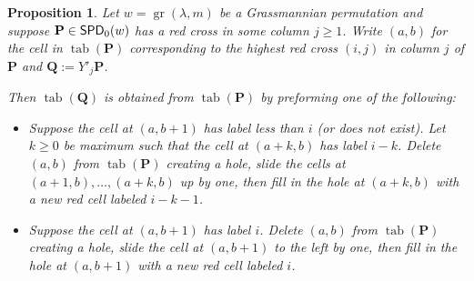 \documentclass[11pt,reqno]{amsart} %
\newcommand{\bfP}{\mathbf{P}}
\newcommand{\bfQ}{\mathbf{Q}}
\DeclareMathOperator{\Grass}{gr}
\DeclareMathOperator{\SPD}{\sf{SPD}}
\DeclareMathOperator{\tab}{tab}
\newtheorem{proposition}[theorem]{Proposition}
\theoremstyle{definition}
\begin{document}
\begin{proposition}
\label{prop:grass pipe dream jdt}
Let $w = \Grass(\lambda,m)$ be a Grassmannian permutation and suppose $\bfP\in \SPD_0(w)$ has a red cross in some column $j\geq 1$.
Write $(a,b)$ for the cell in $\tab(\bfP)$ corresponding to the highest red cross $(i,j)$ in column $j$ of $\bfP$ and $\bfQ := Y'_j\bfP$.

Then $\tab(\bfQ)$ is obtained from $\tab(\bfP)$ by preforming one of the following:

\begin{itemize}
\item[$\lozenge$]
Suppose the cell at $(a,b+1)$ has label less than $i$ (or does not exist).
Let $k\geq 0$ be maximum such that the cell at $(a+k,b)$ has label $i-k$.
Delete $(a,b)$ from $\tab(\bfP)$ creating a hole, slide the cells at $(a+1,b),\dots,(a+k,b)$ up by one, then fill in the hole at $(a+k,b)$ with a new red cell labeled $i-k-1$.

\item[$\blacklozenge$]
Suppose the cell at $(a,b+1)$ has label $i$.
Delete $(a,b)$ from $\tab(\bfP)$ creating a hole, slide the cell at $(a,b+1)$ to the left by one, then fill in the hole at $(a,b+1)$ with a new red cell labeled $i$.
\end{itemize}
\end{proposition}
\end{document}
